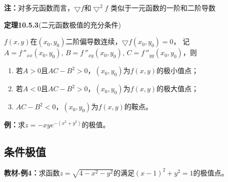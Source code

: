 {\bf 注：}对多元函数而言，$\bigtriangledown f$和$\bigtriangledown^2 f$
类似于一元函数的一阶和二阶导数

{\bf 定理10.5.3}(二元函数极值的充分条件)

$f(x,y)$在$(x_0,y_0)$二阶偏导数连续，$\bigtriangledown f(x_0,y_0)=0$，
记$A=f\,''_{xx}(x_0,y_0),\,B=f\,''_{xy}(x_0,y_0),\,C=f\,''_{yy}(x_0,y_0)$，则
\begin{enumerate}[(1)]
  \setlength{\itemindent}{1cm}
  \item 若$A>0$且$AC-B^2>0$，$(x_0,y_0)$为$f(x,y)$的极小值点；
  \item 若$A<0$且$AC-B^2>0$，$(x_0,y_0)$为$f(x,y)$的极大值点；
  \item $AC-B^2<0$，$(x_0,y_0)$为$f(x,y)$的鞍点。
\end{enumerate}

{\bf 例：}求$z=-xye^{-(x^2+y^2)}$的极值。


\subsection{条件极值}

{\bf 教材-例4：}求函数$z=\sqrt{4-x^2-y^2}$的满足$(x-1)^2+y^2=1$的极值点。

\begin{center}
\end{center}

